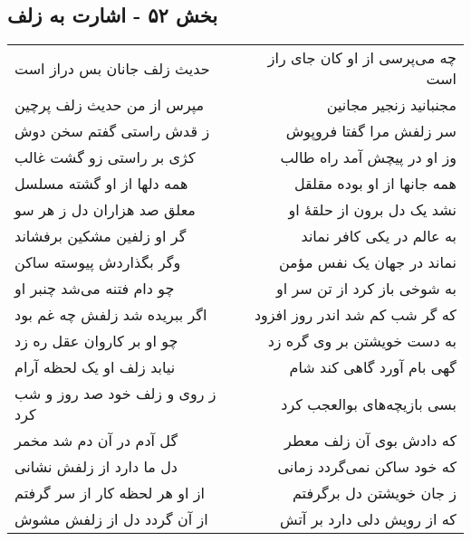 \begin{center}
\section*{بخش ۵۲ - اشارت به زلف}
\label{sec:sh052}
\begin{longtable}{l p{0.5cm} r}
حدیث زلف جانان بس دراز است
&&
چه می‌پرسی از او کان جای راز است
\\
مپرس از من حدیث زلف پرچین
&&
مجنبانید زنجیر مجانین
\\
ز قدش راستی گفتم سخن دوش
&&
سر زلفش مرا گفتا فروپوش
\\
کژی بر راستی زو گشت غالب
&&
وز او در پیچش آمد راه طالب
\\
همه دلها از او گشته مسلسل
&&
همه جانها از او بوده مقلقل
\\
معلق صد هزاران دل ز هر سو
&&
نشد یک دل برون از حلقهٔ او
\\
گر او زلفین مشکین برفشاند
&&
به عالم در یکی کافر نماند
\\
وگر بگذاردش پیوسته ساکن
&&
نماند در جهان یک نفس مؤمن
\\
چو دام فتنه می‌شد چنبر او
&&
به شوخی باز کرد از تن سر او
\\
اگر ببریده شد زلفش چه غم بود
&&
که گر شب کم شد اندر روز افزود
\\
چو او بر کاروان عقل ره زد
&&
به دست خویشتن بر وی گره زد
\\
نیابد زلف او یک لحظه آرام
&&
گهی بام آورد گاهی کند شام
\\
ز روی و زلف خود صد روز و شب کرد
&&
بسی بازیچه‌های بوالعجب کرد
\\
گل آدم در آن دم شد مخمر
&&
که دادش بوی آن زلف معطر
\\
دل ما دارد از زلفش نشانی
&&
که خود ساکن نمی‌گردد زمانی
\\
از او هر لحظه کار از سر گرفتم
&&
ز جان خویشتن دل برگرفتم
\\
از آن گردد دل از زلفش مشوش
&&
که از رویش دلی دارد بر آتش
\\
\end{longtable}
\end{center}
